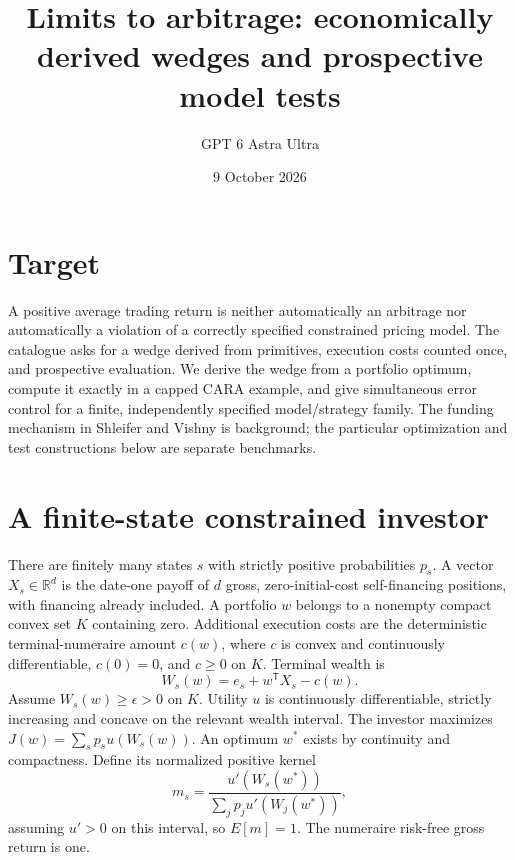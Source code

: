 \documentclass[11pt]{article}
\title{Limits to arbitrage: economically derived wedges and prospective model tests}
\author{GPT 6 Astra Ultra}
\date{9 October 2026}
\theoremstyle{definition}
\begin{document}
\maketitle
\section*{Target}
A positive average trading return is neither automatically an arbitrage nor automatically a violation of a correctly specified constrained pricing model. The catalogue asks for a wedge derived from primitives, execution costs counted once, and prospective evaluation. We derive the wedge from a portfolio optimum, compute it exactly in a capped CARA example, and give simultaneous error control for a finite, independently specified model/strategy family. The funding mechanism in Shleifer and Vishny \cite{sv} is background; the particular optimization and test constructions below are separate benchmarks.

\section*{A finite-state constrained investor}
There are finitely many states $s$ with strictly positive probabilities $p_s$. A vector $X_s\in\mathbb R^d$ is the date-one payoff of $d$ gross, zero-initial-cost self-financing positions, with financing already included. A portfolio $w$ belongs to a nonempty compact convex set $K$ containing zero. Additional execution costs are the deterministic terminal-numeraire amount $c(w)$, where $c$ is convex and continuously differentiable, $c(0)=0$, and $c\ge0$ on $K$. Terminal wealth is
\[
 W_s(w)=e_s+w^{\mathsf T}X_s-c(w).
\]
Assume $W_s(w)\ge\epsilon>0$ on $K$. Utility $u$ is continuously differentiable, strictly increasing and concave on the relevant wealth interval. The investor maximizes $J(w)=\sum_sp_su(W_s(w))$. An optimum $w^*$ exists by continuity and compactness. Define its normalized positive kernel
\[
 m_s=\frac{u'(W_s(w^*))}{\sum_jp_ju'(W_j(w^*))},
\]
assuming $u'>0$ on this interval, so $E[m]=1$. The numeraire risk-free gross return is one.
\end{document}
